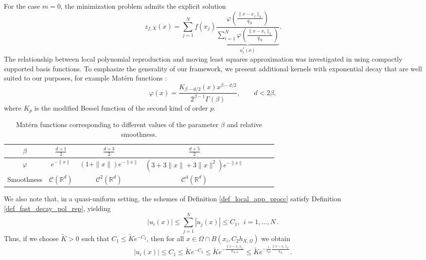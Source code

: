 \documentclass{drna}
\begin{document}
For the case $m=0$, the minimization problem admits the explicit solution
\begin{equation*}
    z_{f,X}(x) = \sum_{j=1}^{N} f(x_j) \underbrace{\frac{\varphi \left(\frac{\|x-x_j\|_2}{q_X}\right)}{\sum_{i=1}^N \varphi \left(\frac{\|x-x_i\|_2}{q_X}\right)}}_{a_{j}^{*}(x)}.
\end{equation*}
The relationship between local polynomial reproduction and moving least squares approximation was investigated in \cite{wendland_2001} using compactly supported basis functions. To emphasize the generality of our framework, we present additional kernels with exponential decay that are well suited to our purposes, for example Mat\'ern functions \cite{matern_2013}:
\begin{equation*}
    \varphi(x) = \frac{K_{\beta-d/2}(x)x^{\beta-d/2}}{2^{\beta-1}\Gamma(\beta)}, \qquad d < 2\beta,
\end{equation*}
where $K_p$ is the modified Bessel function of the second kind of order $p$.
\begin{table}[H]
\begin{center}
\begin{tabular}{Sc | Sc Sc Sc}
\hline
$\beta$ & $\frac{d+1}{2}$ & $\frac{d+3}{2}$ & $\frac{d+5}{2}$ \\ \hline
 $\varphi$ & $e^{-\|x\|}$ & $(1+\|x\|)e^{-\|x\|}$ & $(3+3\|x\|+3\|x\|^2)e^{-\|x\|}$ \\ \hline
   Smoothness & $\mathcal{C}(\mathbb{R}^d)$ & $\mathcal{C}^2(\mathbb{R}^d)$ & $\mathcal{C}^4(\mathbb{R}^d)$\\ \hline
\end{tabular}
\end{center}
\caption{Mat\'ern functions corresponding to different values of the parameter $\beta$ and relative smoothness.}
\end{table}
\noindent We also note that, in a quasi-uniform setting, the schemes of Definition \ref{def_local_app_procc} satisfy Definition \ref{def_fast_decay_pol_rep}, yielding
\begin{equation*}
    |u_{i}(x)| \leq \sum_{j=1}^N |u_{j}(x)| \leq C_1,\; \, i=1,\ldots, N\,.
\end{equation*}
Thus, if we choose $\widetilde{K}>0$ such that $C_1 \leq \widetilde{K} e^{-C_2}$, then for all $x\in \Omega \cap B(x_i, C_2 h_{X,\Omega})$ we obtain
\begin{equation*}
    |u_{i}(x)| \leq C_1 \leq \widetilde{K}e^{-C_2} \leq \widetilde{K} e^{-\frac{\|x-x_i\|_2}{h_{X,\Omega}}} \leq \widetilde{K}e^{-\frac{1}{c_{qu}} \frac{\|x-x_i\|_2}{q_X}}.
\end{equation*}
\end{document}
